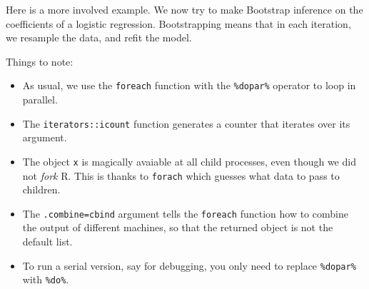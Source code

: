 \documentclass[]{book}
\newenvironment{Shaded}{\begin{snugshade}}{\end{snugshade}}
\newcommand{\DataTypeTok}[1]{\textcolor[rgb]{0.13,0.29,0.53}{#1}}
\newcommand{\DecValTok}[1]{\textcolor[rgb]{0.00,0.00,0.81}{#1}}
\newcommand{\FloatTok}[1]{\textcolor[rgb]{0.00,0.00,0.81}{#1}}
\newcommand{\KeywordTok}[1]{\textcolor[rgb]{0.13,0.29,0.53}{\textbf{#1}}}
\newcommand{\NormalTok}[1]{#1}
\newcommand{\OperatorTok}[1]{\textcolor[rgb]{0.81,0.36,0.00}{\textbf{#1}}}
\newcommand{\OtherTok}[1]{\textcolor[rgb]{0.56,0.35,0.01}{#1}}
\newcommand{\StringTok}[1]{\textcolor[rgb]{0.31,0.60,0.02}{#1}}
\providecommand{\tightlist}{%
  \setlength{\itemsep}{0pt}\setlength{\parskip}{0pt}}
\theoremstyle{definition}
\theoremstyle{definition}
\theoremstyle{definition}
\theoremstyle{remark}
\begin{document}
Here is a more involved example.
We now try to make Bootstrap inference on the coefficients of a logistic regression.
Bootstrapping means that in each iteration, we resample the data, and refit the model.

\begin{Shaded}
\end{Shaded}

Things to note:

\begin{itemize}
\tightlist
\item
  As usual, we use the \texttt{foreach} function with the \texttt{\%dopar\%} operator to loop in parallel.
\item
  The \texttt{iterators::icount} function generates a counter that iterates over its argument.
\item
  The object \texttt{x} is magically avaiable at all child processes, even though we did not \emph{fork} R. This is thanks to \texttt{forach} which guesses what data to pass to children.
\item
  The \texttt{.combine=cbind} argument tells the \texttt{foreach} function how to combine the output of different machines, so that the returned object is not the default list.
\item
  To run a serial version, say for debugging, you only need to replace \texttt{\%dopar\%} with \texttt{\%do\%}.
\end{itemize}
\end{document}
